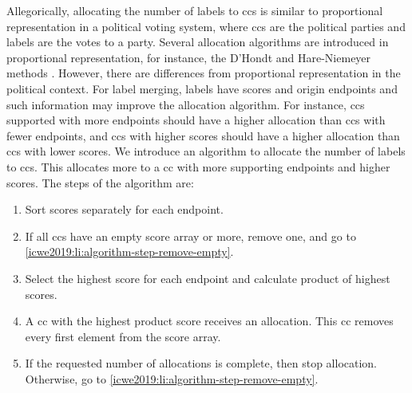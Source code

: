 Allegorically, allocating the number of labels to \glspl{cc} is similar to proportional representation in a political voting system, where \glspl{cc} are the political parties and labels are the votes to a party.
Several allocation algorithms are introduced in proportional representation, for instance, the D'Hondt and Hare-Niemeyer methods \citep{Niemeyer2008240}.
However, there are differences from proportional representation in the political context.
For label merging, labels have scores and origin endpoints and such information may improve the allocation algorithm.
For instance, \glspl{cc} supported with more endpoints should have a higher allocation than \glspl{cc} with fewer endpoints, and \glspl{cc} with higher scores should have a higher allocation than \glspl{cc} with lower scores.
We introduce an algorithm to allocate the number of labels to \glspl{cc}. This allocates more to a \gls{cc} with more supporting endpoints and higher scores.
The steps of the algorithm are:

\begin{enumerate}[label=\textbf{Step \Roman*.}, ref={Step \Roman*}, leftmargin=2.75\parindent]
  \item Sort scores separately for each endpoint. \label{icwe2019:li:algorithm-step-sort}
  \item If all \glspl{cc} have an empty score array or more, remove one, and go to \ref{icwe2019:li:algorithm-step-remove-empty}. \label{icwe2019:li:algorithm-step-remove-empty}
  \item Select the highest score for each endpoint and calculate product of highest scores.
  \item A \gls{cc} with the highest product score receives an allocation. This \gls{cc} removes every first element from the score array.
  \item If the requested number of allocations is complete, then stop allocation. Otherwise, go to \ref{icwe2019:li:algorithm-step-remove-empty}. \label{icwe2019:li:algorithm-step-last}
\end{enumerate}

